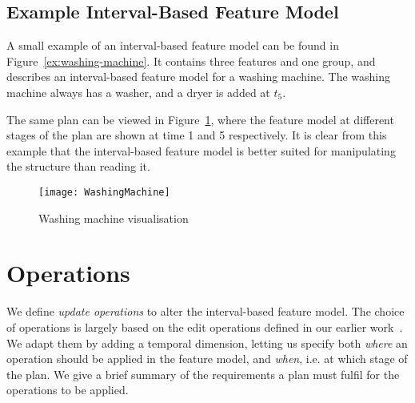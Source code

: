 \subsection{Example \textemdash{} Interval-Based Feature Model}
A small example of an interval-based feature model can be found in Figure~\ref{ex:washing-machine}. It contains three features and one group, and describes an interval-based feature model for a washing machine. The washing machine always has a washer, and a dryer is added at $t_5$. 

The same plan can be viewed in Figure~\ref{ex:washing-machine-visual}, where the feature model at different stages of the plan are shown at time 1 and 5 respectively. It is clear from this example that the interval-based feature model is better suited for manipulating the structure than reading it. 

\begin{figure}[htpb]
  \centering
  \texttt{[image: WashingMachine]}
  \caption{Washing machine visualisation}
  \label{ex:washing-machine-visual}
\end{figure}

\section{Operations}
\label{sec:operations}

We define \emph{update operations} to alter the interval-based feature model. The choice of operations is largely based on the edit operations defined in our earlier work~\cite{art:consistency-preserving-evolution-planning}. We adapt them by adding a temporal dimension, letting us specify both \emph{where} an operation should be applied in the feature model, and \emph{when}, i.e. at which stage of the plan. We give a brief summary of the requirements a plan must fulfil for the operations to be applied.

